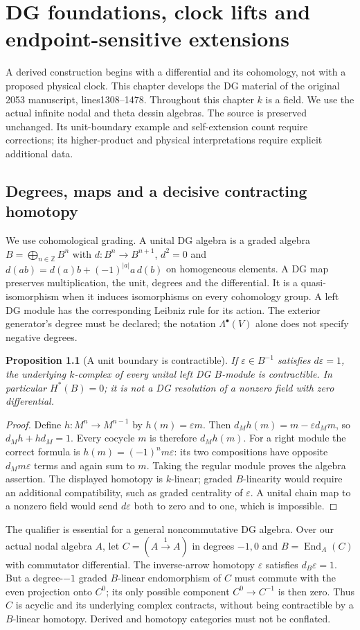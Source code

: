 \documentclass[11pt,oneside,openany]{book}
\newtheorem{proposition}[theorem]{Proposition}
\theoremstyle{definition}\newtheorem{definition}[theorem]{Definition}
\theoremstyle{remark}\newtheorem{remark}[theorem]{Remark}
\begin{document}
\chapter[DG foundations and actual clock lifts]{DG foundations, clock lifts and endpoint-sensitive extensions}
\label{dg:chapter}
A derived construction begins with a differential and its cohomology, not
with a proposed physical clock. This chapter develops the DG material of the
original 2053 manuscript, lines1308--1478. Throughout this chapter $k$ is a
field. We use the actual infinite nodal
and theta dessin algebras. The source is preserved unchanged. Its unit-boundary
example and self-extension count require corrections; its higher-product
and physical interpretations require explicit additional data.

\section{Degrees, maps and a decisive contracting homotopy}
We use cohomological grading. A unital DG algebra is a graded algebra
$B=\bigoplus_{n\in\mathbb Z}B^n$ with $d:B^n\to B^{n+1}$,
$d^2=0$ and $d(ab)=d(a)b+(-1)^{|a|}a\,d(b)$ on homogeneous elements.
A DG map preserves multiplication, the unit, degrees and the differential.
It is a quasi-isomorphism when it induces isomorphisms on every cohomology
group. A left DG module has the corresponding Leibniz rule for its action.
The exterior generator's degree must be declared; the notation
$\Lambda^\bullet(V)$ alone does not specify negative degrees.

\begin{proposition}[A unit boundary is contractible]\label{dg:unit}
If $\varepsilon\in B^{-1}$ satisfies $d\varepsilon=1$, the underlying
$k$-complex of every unital left DG $B$-module is contractible. In particular $H^*(B)=0$; it is not a DG
resolution of a nonzero field with zero differential.
\end{proposition}
\begin{proof}
Define $h:M^n\to M^{n-1}$ by $h(m)=\varepsilon m$. Then
$d_Mh(m)=m-\varepsilon d_Mm$, so $d_Mh+hd_M=1$. Every cocycle $m$
is therefore $d_Mh(m)$. For a right module the correct formula is
$h(m)=(-1)^n m\varepsilon$: its two compositions have opposite
$d_Mm\varepsilon$ terms and again sum to $m$. Taking the regular module
proves the algebra assertion. The displayed homotopy is $k$-linear; graded
$B$-linearity would require an additional compatibility, such as graded
centrality of $\varepsilon$. A unital chain map to a nonzero field would
send $d\varepsilon$ both to zero and to one, which is impossible.
\end{proof}
The qualifier is essential for a general noncommutative DG algebra.
Over our actual nodal algebra $A$, let $C=(A\xrightarrow{1}A)$ in degrees
$-1,0$ and $B=\operatorname{End}_A(C)$ with commutator differential.
The inverse-arrow homotopy $\varepsilon$ satisfies $d_B\varepsilon=1$.
But a degree-$-1$ graded $B$-linear endomorphism of $C$ must commute with
the even projection onto $C^0$; its only possible component $C^0\to C^{-1}$
is then zero. Thus $C$ is acyclic and its underlying complex contracts,
without being contractible by a $B$-linear homotopy. Derived and homotopy
categories must not be conflated.
\end{document}
